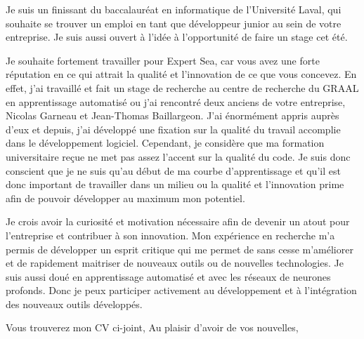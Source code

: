 \documentclass[11pt, letterpaper]{awesome-cv} %
\begin{document}
\makecvheader %

\makelettertitle %


\begin{cvletter}


\vspace{10mm}

Je suis un finissant du baccalauréat en informatique de l'Université Laval, qui souhaite se trouver un emploi en tant que développeur junior au sein de votre entreprise. Je suis aussi ouvert à l'idée à l'opportunité de faire un stage cet été. 

Je souhaite fortement travailler pour Expert Sea, car vous avez une forte réputation en ce qui attrait la qualité et l'innovation de ce que vous concevez. En effet, j'ai travaillé et fait un stage de recherche au centre de recherche du GRAAL en apprentissage automatisé ou j'ai rencontré deux anciens de votre entreprise, Nicolas Garneau et Jean-Thomas Baillargeon. J'ai énormément appris auprès d'eux et depuis, j'ai développé une fixation sur la qualité du travail accomplie dans le développement logiciel. Cependant, je considère que ma formation universitaire reçue ne met pas assez l'accent sur la qualité du code. Je suis donc conscient que je ne suis qu’au début de ma courbe d'apprentissage et qu'il est donc important de travailler dans un milieu ou la qualité et l'innovation prime afin de pouvoir développer au maximum mon potentiel.

Je crois avoir la curiosité et motivation nécessaire afin de devenir un atout pour l'entreprise et contribuer à son innovation. Mon expérience en recherche m'a permis de développer un esprit critique qui me permet de sans cesse m'améliorer et de rapidement maitriser de nouveaux outils ou de nouvelles technologies. Je suis aussi doué en apprentissage automatisé et avec les réseaux de neurones profonds. Donc je peux participer activement au développement et à l'intégration des nouveaux outils développés. 

Vous trouverez mon CV ci-joint,
Au plaisir d'avoir de vos nouvelles,




\end{cvletter}


\vspace{15mm}

\makeletterclosing %
\end{document}
